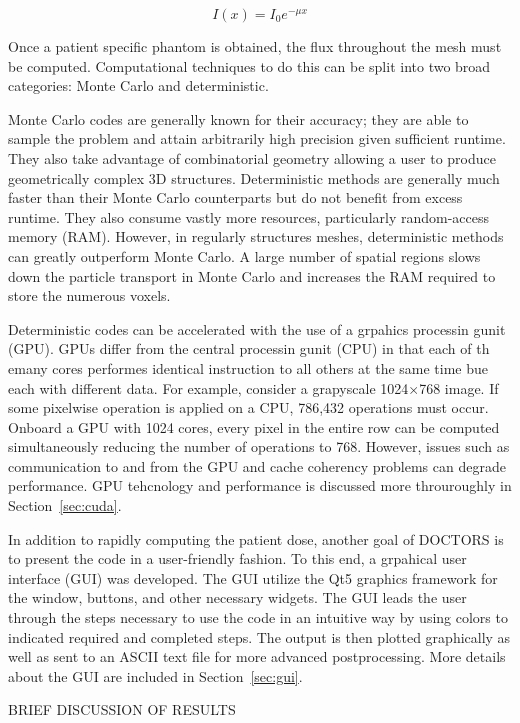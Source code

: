\begin{equation}\label{eq:beer_lambert}
I(x) = I_0 e^{-\mu x}
\end{equation}

Once a patient specific phantom is obtained, the flux throughout the mesh must be computed. Computational techniques to do this can be split into two broad categories: Monte Carlo and deterministic.

Monte Carlo codes are generally known for their accuracy; they are able to sample the problem and attain arbitrarily high precision given sufficient runtime. They also take advantage of combinatorial geometry allowing a user to produce geometrically complex 3D structures. Deterministic methods are generally much faster than their Monte Carlo counterparts but do not benefit from excess runtime. They also consume vastly more resources, particularly random-access memory (RAM). However, in regularly structures meshes, deterministic methods can greatly outperform Monte Carlo. A large number of spatial regions slows down the particle transport in Monte Carlo and increases the RAM required to store the numerous voxels.

Deterministic codes can be accelerated with the use of a grpahics processin gunit (GPU). GPUs differ from the central processin gunit (CPU) in that  each of th emany cores performes identical instruction to all others at the same time bue each with different data. For example, consider a grapyscale 1024$\times$768 image. If some pixelwise operation is applied on a CPU, 786,432 operations must occur. Onboard a GPU with 1024 cores, every pixel in the entire row can be computed simultaneously reducing the number of operations to 768. However, issues such as communication to and from the GPU and cache coherency problems can degrade performance. GPU tehcnology and performance is discussed more throuroughly in Section~\ref{sec:cuda}.

In addition to rapidly computing the patient dose, another goal of DOCTORS is to present the code in a user-friendly fashion. To this end, a grpahical user interface (GUI) was developed. The GUI utilize the Qt5 graphics framework for the window, buttons, and other necessary widgets. The GUI leads the user through the steps necessary to use the code in an intuitive way by using colors to indicated required and completed steps. The output is then plotted graphically as well as sent to an ASCII text file for more advanced postprocessing. More details about the GUI are included in Section~\ref{sec:gui}.

BRIEF DISCUSSION OF RESULTS

\endinput

